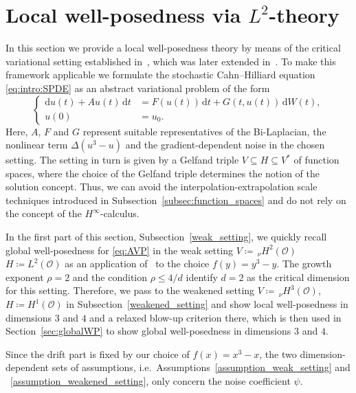 \documentclass[reqno]{amsart}
\newcommand{\sO}{\mathscr{O}}
\newcommand{\seq}{\subseteq}
\newcommand{\1}{\mathbf{1}}
\newcommand{\dt}{\,\mathrm{d}t}
\newcommand{\nH}{\ensuremath{\,_\nu H}}
\newcommand{\dd}{\ensuremath{\mathrm{d}}}
\begin{document}
\section{Local well-posedness via \texorpdfstring{$L^2$}{\textit{L2}}-theory}\label{sec:variational:lwp}
In this section we provide a local well-posedness theory by means of the critical variational setting established in~\cite{agrestiCriticalVariationalSetting2024a}, which was later extended in~\cite{BechtelGermVeraar2026}. 
To make this framework applicable we formulate the stochastic Cahn--Hilliard equation \eqref{eq:intro:SPDE} as an abstract variational problem of the form
\begin{equation}\tag{AVP}\label{eq:AVP}
    \begin{cases}
        \dd u(t) + Au(t)\dt  &= F(u(t)) \dt + G(t,u(t))\,\dd W(t), \\
        u(0) &=u_0.
    \end{cases}
\end{equation}
Here, $A$, $F$ and $G$ represent suitable representatives of the Bi-Laplacian, the nonlinear term $\Delta(u^3-u)$ and the gradient-dependent noise in the chosen setting. The setting in turn is given by a Gelfand triple $V\seq H \seq V^\ast$ of function spaces, where the choice of the Gelfand triple determines the notion of the solution concept. Thus, we can avoid the interpolation-extrapolation scale techniques introduced in Subsection~\ref{subsec:function_spaces} and do not rely on the concept of the $H^\infty$-calculus.

In the first part of this section, Subsection~\ref{weak_setting}, we quickly recall global well-posedness for \eqref{eq:AVP} in the weak setting $V\coloneq \nH^2(\sO)$ $ H\coloneq L^2(\sO)$ as an application of~\cite[Thm~5.2]{agrestiCriticalVariationalSetting2024a} to the choice $f(y) = y^3-y$. The growth exponent $\rho = 2$ and the condition $\rho \leq 4/d$ identify $d=2$ as the critical dimension for this setting. Therefore, we pass to the weakened setting $V\coloneq\nH^3(\sO)$, $ H\coloneq H^1(\sO)$ in Subsection~\ref{weakened_setting} and show local well-posedness in dimensions $3$ and $4$ and a relaxed blow-up criterion there, which is then used in Section~\ref{sec:globalWP} to show global well-posedness in dimensions $3$ and $4$.

Since the drift part is fixed by our choice of $f(x) = x^3-x$, the two dimension-dependent sets of assumptions, i.e.\ Assumptions~\ref{assumption_weak_setting} and ~\ref{assumption_weakened_setting}, only concern the noise coefficient $\psi$. 
\end{document}

